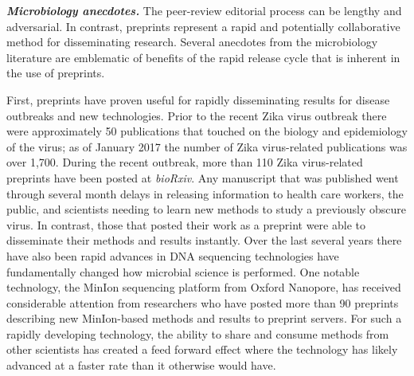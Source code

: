 \documentclass[11pt,]{article}
\begin{document}
\textbf{\emph{Microbiology anecdotes.}} The peer-review editorial
process can be lengthy and adversarial. In contrast, preprints represent
a rapid and potentially collaborative method for disseminating research.
Several anecdotes from the microbiology literature are emblematic of
benefits of the rapid release cycle that is inherent in the use of
preprints.

First, preprints have proven useful for rapidly disseminating results
for disease outbreaks and new technologies. Prior to the recent Zika
virus outbreak there were approximately 50 publications that touched on
the biology and epidemiology of the virus; as of January 2017 the number
of Zika virus-related publications was over 1,700. During the recent
outbreak, more than 110 Zika virus-related preprints have been posted at
\emph{bioRxiv}. Any manuscript that was published went through several
month delays in releasing information to health care workers, the
public, and scientists needing to learn new methods to study a
previously obscure virus. In contrast, those that posted their work as a
preprint were able to disseminate their methods and results instantly.
Over the last several years there have also been rapid advances in DNA
sequencing technologies have fundamentally changed how microbial science
is performed. One notable technology, the MinIon sequencing platform
from Oxford Nanopore, has received considerable attention from
researchers who have posted more than 90 preprints describing new
MinIon-based methods and results to preprint servers. For such a rapidly
developing technology, the ability to share and consume methods from
other scientists has created a feed forward effect where the technology
has likely advanced at a faster rate than it otherwise would have.
\end{document}
